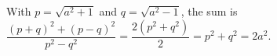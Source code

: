 With $p=\sqrt{a^2+1}$ and $q=\sqrt{a^2-1}$, the sum is $\dfrac{(p+q)^2+(p-q)^2}{p^2-q^2}=\dfrac{2(p^2+q^2)}{2}=p^2+q^2=\boxed{2a^2}$.
